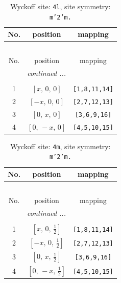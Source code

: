 \documentclass[fleqn,8pt]{jsarticle}
\begin{document}
\renewcommand{\arraystretch}{1.2}
\begin{longtable}{ccc}
\caption{Wyckoff site: {\tt 4l}, site symmetry: {\tt m'2'm.}}
 \\
 \hline \hline
No. & position & mapping \\ \hline \endfirsthead

\multicolumn{2}{l}{\tablename\ \thetable{}} \\
 \hline \hline
No. & position & mapping \\ \hline \endhead

 \hline \hline
\multicolumn{2}{r}{\footnotesize\it continued ...} \\ \endfoot

 \hline \hline
\multicolumn{2}{r}{} \\ \endlastfoot

1 & $\left[ x,\, 0,\, 0 \right]$ & {\tt [1,8,11,14]} \\ \hline
2 & $\left[ - x,\, 0,\, 0 \right]$ & {\tt [2,7,12,13]} \\ \hline
3 & $\left[ 0,\, x,\, 0 \right]$ & {\tt [3,6,9,16]} \\ \hline
4 & $\left[ 0,\, - x,\, 0 \right]$ & {\tt [4,5,10,15]} \\
\end{longtable}
\renewcommand{\arraystretch}{1.2}
\begin{longtable}{ccc}
\caption{Wyckoff site: {\tt 4m}, site symmetry: {\tt m'2'm.}}
 \\
 \hline \hline
No. & position & mapping \\ \hline \endfirsthead

\multicolumn{2}{l}{\tablename\ \thetable{}} \\
 \hline \hline
No. & position & mapping \\ \hline \endhead

 \hline \hline
\multicolumn{2}{r}{\footnotesize\it continued ...} \\ \endfoot

 \hline \hline
\multicolumn{2}{r}{} \\ \endlastfoot

1 & $\left[ x,\, 0,\, \frac{1}{2} \right]$ & {\tt [1,8,11,14]} \\ \hline
2 & $\left[ - x,\, 0,\, \frac{1}{2} \right]$ & {\tt [2,7,12,13]} \\ \hline
3 & $\left[ 0,\, x,\, \frac{1}{2} \right]$ & {\tt [3,6,9,16]} \\ \hline
4 & $\left[ 0,\, - x,\, \frac{1}{2} \right]$ & {\tt [4,5,10,15]} \\
\end{longtable}
\end{document}

